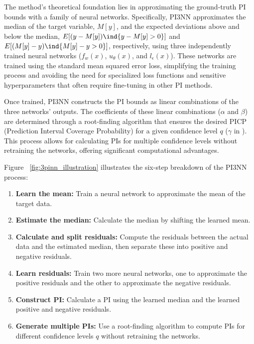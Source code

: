 The method's theoretical foundation lies in approximating the ground-truth PI bounds with a family of neural networks. Specifically, PI3NN approximates the median of the target variable, $M[y]$, and the expected deviations above and below the median, $E[(y - M[y]) \ind{y-M[y]>0}]$ and $E[(M[y] - y) \ind{M[y]-y>0}]$, respectively, using three independently trained neural networks ($f_w(x)$, $u_\theta(x)$, and $l_\epsilon(x)$). These networks are trained using the standard mean squared error loss, simplifying the training process and avoiding the need for specialized loss functions and sensitive hyperparameters that often require fine-tuning in other PI methods.

Once trained, PI3NN constructs the PI bounds as linear combinations of the three networks' outputs. The coefficients of these linear combinations ($\alpha$ and $\beta$) are determined through a root-finding algorithm that ensures the desired PICP (Prediction Interval Coverage Probability) for a given confidence level $q$ ($\gamma$ in \cite{pi3nn}). This process allows for calculating PIs for multiple confidence levels without retraining the networks, offering significant computational advantages.


Figure ~\vref{fig:3pinn_illustration} illustrates the six-step breakdown of the PI3NN process:
\begin{enumerate}
    \item \textbf{Learn the mean:} Train a neural network to approximate the mean of the target data.
    \item \textbf{Estimate the median:} Calculate the median by shifting the learned mean.
    \item \textbf{Calculate and split residuals:} Compute the residuals between the actual data and the estimated median, then separate these into positive and negative residuals.
    \item \textbf{Learn residuals:} Train two more neural networks, one to approximate the positive residuals and the other to approximate the negative residuals.
    \item \textbf{Construct PI:} Calculate a PI using the learned median and the learned positive and negative residuals.
    \item \textbf{Generate multiple PIs:} Use a root-finding algorithm to compute PIs for different confidence levels $q$ without retraining the networks.
\end{enumerate}



